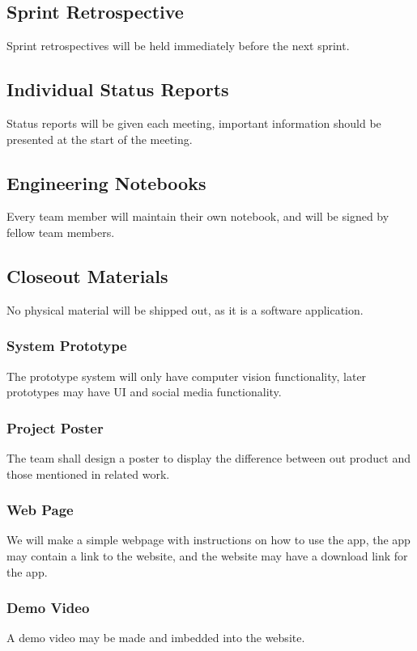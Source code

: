 \subsection{Sprint Retrospective}
Sprint retrospectives will be held immediately before the next sprint.

\subsection{Individual Status Reports}
Status reports will be given each meeting, important information should be presented at the start of the meeting.

\subsection{Engineering Notebooks}
Every team member will maintain their own notebook, and will be signed by fellow team members.

\subsection{Closeout Materials}
No physical material will be shipped out, as it is a software application.

\subsubsection{System Prototype}
The prototype system will only have computer vision functionality, later prototypes may have UI and social media functionality.

\subsubsection{Project Poster}
The team shall design a poster to display the difference between out product and those mentioned in related work.

\subsubsection{Web Page}
We will make a simple webpage with instructions on how to use the app, the app may contain a link to the website, and the website may have a download link for the app.

\subsubsection{Demo Video}
A demo video may be made and imbedded into the website.

